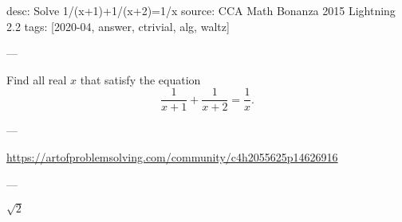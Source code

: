 desc: Solve 1/(x+1)+1/(x+2)=1/x
source: CCA Math Bonanza 2015 Lightning 2.2
tags: [2020-04, answer, ctrivial, alg, waltz]

---

Find all real $x$ that satisfy the equation \[\frac1{x+1}+\frac1{x+2}=\frac1x.\]

---

\url{https://artofproblemsolving.com/community/c4h2055625p14626916}

---

$\sqrt2$
